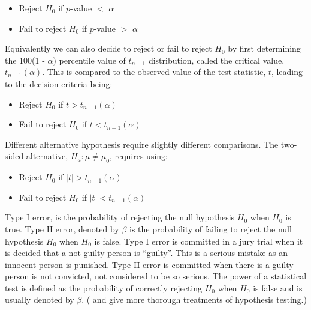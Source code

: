\begin{itemize} \itemsep 0in
\item Reject $H_0$ if $p$-value $<$ $\alpha$
\item Fail to reject $H_0$ if $p$-value $>$ $\alpha$
\end{itemize}

Equivalently we can also decide to reject or fail to reject $H_0$ by first determining the 100(1 - $\alpha$) percentile value of $t_{n-1}$ distribution, called the critical value, $t_{n-1}(\alpha)$. This is compared to the observed value of the test statistic, $t$, leading to the decision criteria being:

\begin{itemize} \itemsep 0in
\item Reject $H_0$ if $t > t_{n-1}(\alpha)$
\item Fail to reject $H_0$ if $t < t_{n-1}(\alpha)$
\end{itemize}

Different alternative hypothesis require slightly different comparisons. The two-sided alternative, $H_a: \mu \ne \mu_0$, requires using: 

\begin{itemize}\itemsep 0in
\item Reject $H_0$ if $|t| > t_{n-1}(\alpha)$
\item Fail to reject $H_0$ if $|t| < t_{n-1}(\alpha)$
\end{itemize}

Type I error, is the probability of rejecting the null hypothesis $H_0$ when $H_0$ is true. Type II error, denoted by $\beta$ is the probability of failing to reject the null hypothesis $H_0$ when $H_0$ is false. Type I error is committed in a jury trial when it is decided that a not guilty person is  ``guilty''. This is a serious mistake as an innocent person is punished. Type II error is committed when there is a guilty person is not convicted, not considered to be so serious. The power of a statistical test is defined as the probability of correctly rejecting $H_0$ when $H_0$ is false and is usually denoted by $\beta$. (\cite{casella:2002} and \cite{lehman:1997} give more thorough treatments of hypothesis testing.)
 

